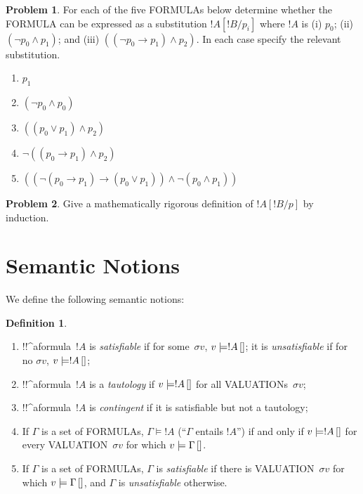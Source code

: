 \documentclass[10pt,a4paper]{article}
\newcommand*{\olup}[1]{\MakeUppercase{#1}}
\theoremstyle{plain}
\theoremstyle{definition}
\newtheorem{defn}[thm]{Definition}
\newtheorem{prob}{Problem}[section]
\theoremstyle{remark}
\newcommand*{\olfileid}[3]{}
\newcommand*{\olsection}[1]{\section*{#1}}
\providecommand{\lif}{\mathbin{\rightarrow}}
\providecommand{\Entails}{\mathrel{\models}}
\providecommand{\Subst}[3]{#1[#2/#3]}
\providecommand{\Obj}{}
\providecommand{\pSat}[3]{#1 \models #2\,[#3]}
\providecommand{\pAssign}{\sigma}
\begin{document}
\begin{prob} For each of the five \olup{formula}s below determine whether the 
 \olup{formula} can be expressed as a substitution \( \Subst{!A}{!B}{\Obj p_i} \)
 where \( !A \) is (i) \( \Obj p_0 \); (ii) \( ( \lnot \Obj p_0 \land \Obj
 p_1) \); and (iii) \( ( ( \lnot \Obj p_0 \lif \Obj p_1 ) \land \Obj
 p_2 ) \). In each case specify the relevant substitution.
  \begin{enumerate}
    \item \( \Obj p_1 \) 
    \item \( ( \lnot \Obj p_0 \land \Obj p_0 ) \)
    \item \( ( ( \Obj p_0 \lor \Obj p_1 ) \land \Obj p_2 )  \)
    \item \( \lnot ( ( \Obj p_0 \lif \Obj p_1 ) \land \Obj p_2 ) \)
    \item \( (( \lnot ( \Obj p_0 \lif \Obj p_1 ) \lif ( \Obj p_0 \lor \Obj p_1 )) \land \lnot ( \Obj p_0 \land \Obj p_1 )) \)
  \end{enumerate}
\end{prob}

\begin{prob}
Give a mathematically rigorous definition of $\Subst{!A}{!B}{p}$ by
induction.
\end{prob}






\olfileid{pl}{syn}{sem}

\olsection{Semantic Notions}

We define the following semantic notions:

\begin{defn} 
\begin{enumerate}
\item !!^a{formula}~$!A$ is \emph{satisfiable} if for
  some~$\pAssign{v}$, $\pSat{v}{!A}$; it is
  \emph{unsatisfiable} if for no $\pAssign{v}$, $\pSat{v}{!A}$;
\item !!^a{formula}~$!A$ is a \emph{tautology} if $\pSat{v}{!A}$ for
  all \olup{valuation}s~$\pAssign{v}$;
\item !!^a{formula}~$!A$ is \emph{contingent} if it is satisfiable but
  not a tautology;
\item If $\Gamma$ is a set of \olup{formula}s, $\Gamma \Entails !A$ (``$\Gamma$
  entails $!A$'') if and only if $\pSat{v}{!A}$ for every
  \olup{valuation}~$\pAssign{v}$ for which $\pSat{v}{\Gamma}$.
\item If $\Gamma$ is a set of \olup{formula}s, $\Gamma$ is
  \emph{satisfiable} if there is \olup{valuation}~$\pAssign{v}$ for which
  $\pSat{v}{\Gamma}$, and $\Gamma$ is
  \emph{unsatisfiable} otherwise.
\end{enumerate} 
\end{defn}
\end{document}

